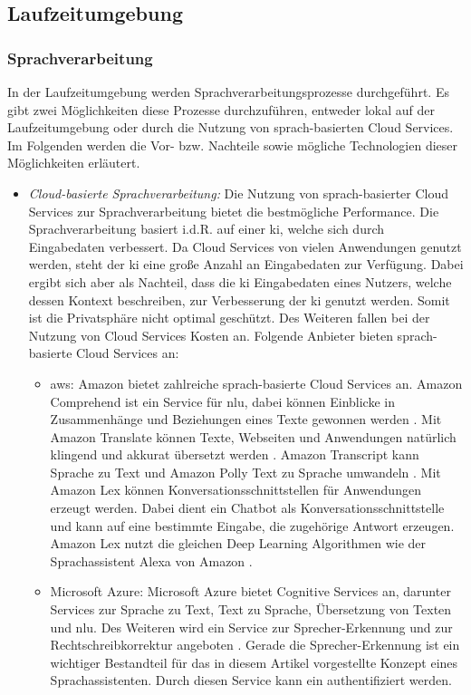 \subsection{Laufzeitumgebung}
\subsubsection{Sprachverarbeitung}
In der Laufzeitumgebung werden Sprachverarbeitungsprozesse durchgeführt. Es gibt zwei Möglichkeiten diese Prozesse durchzuführen, entweder lokal auf der Laufzeitumgebung oder durch die Nutzung von sprach-basierten Cloud Services. Im Folgenden werden die Vor- bzw. Nachteile sowie mögliche Technologien dieser Möglichkeiten erläutert.
\begin{itemize}
	\item \textsl{Cloud-basierte Sprachverarbeitung:} Die Nutzung von sprach-basierter Cloud Services zur Sprachverarbeitung bietet die bestmögliche Performance. Die Sprachverarbeitung basiert i.d.R. auf einer \ac{ki}, welche sich durch Eingabedaten verbessert. Da Cloud Services von vielen Anwendungen genutzt werden, steht der \ac{ki} eine große Anzahl an Eingabedaten zur Verfügung. Dabei ergibt sich aber als Nachteil, dass die \ac{ki} Eingabedaten eines Nutzers, welche dessen Kontext beschreiben, zur Verbesserung der \ac{ki} genutzt werden. Somit ist die Privatsphäre nicht optimal geschützt. Des Weiteren fallen bei der Nutzung von Cloud Services Kosten an. Folgende Anbieter bieten sprach-basierte Cloud Services an:
	\begin{itemize}
		\item \ac{aws}: Amazon bietet zahlreiche sprach-basierte Cloud Services an. Amazon Comprehend ist ein Service für \ac{nlu}, dabei können Einblicke in Zusammenhänge und Beziehungen eines Texte gewonnen werden \cite{AmazonComprehed}. Mit Amazon Translate können Texte, Webseiten und Anwendungen natürlich klingend und akkurat übersetzt werden \cite{AmazonTranslate}. Amazon Transcript kann Sprache zu Text und Amazon Polly Text zu Sprache umwandeln \cite{AmazonTranscript} \cite{AmazonPolly}. Mit Amazon Lex können Konversationsschnittstellen für Anwendungen erzeugt werden. Dabei dient ein Chatbot als Konversationsschnittstelle und kann auf eine bestimmte Eingabe, die zugehörige Antwort erzeugen. Amazon Lex nutzt die gleichen Deep Learning Algorithmen wie der Sprachassistent Alexa von Amazon \cite{AmazonLex}.
		\item Microsoft Azure: Microsoft Azure bietet Cognitive Services an, darunter Services zur Sprache zu Text, Text zu Sprache, Übersetzung von Texten und \ac{nlu}. Des Weiteren wird ein Service zur Sprecher-Erkennung und zur Rechtschreibkorrektur angeboten \cite{MicrosoftAzureCognitiveServices}. Gerade die Sprecher-Erkennung ist ein wichtiger Bestandteil für das in diesem Artikel vorgestellte Konzept eines Sprachassistenten. Durch diesen Service kann ein authentifiziert werden.  

\end{itemize}
\end{itemize}
